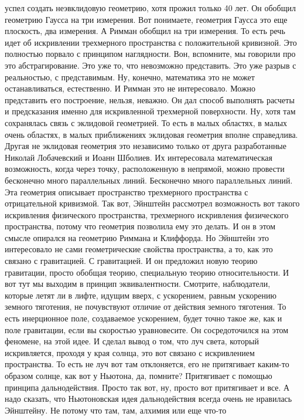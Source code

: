 успел создать неэвклидовую геометрию, хотя прожил только 40 лет. Он обобщил
геометрию Гаусса на три измерения. Вот понимаете, геометрия Гаусса это еще
плоскость, два измерения. А Римман обобщил на три измерения. То есть речь идет
об искривлении трехмерного пространства с положительной кривизной. Это полностью
порвало с принципом наглядности. Вон, вспомните, мы говорили про это
абстрагирование. Это уже то, что невозможно представить. Это уже разрыв с
реальностью, с представимым. Ну, конечно, математика это не может
останавливаться, естественно. И Римман это не интересовало. Можно представить
его построение, нельзя, неважно. Он дал способ выполнять расчеты и предсказания
именно для искривленной трехмерной поверхности. Ну, хотя там сохранялась связь с
эклидовой геометрией. То есть в малых областях, в малых очень областях, в малых
приближениях эклидовая геометрия вполне справедлива. Другая не эклидовая
геометрия это независимо только от друга разработанные Николай Лобачевский и
Иоанн Шболиев. Их интересовала математическая возможность, когда через точку,
расположенную в непрямой, можно провести бесконечно много параллельных линий.
Бесконечно много параллельных линий. Эта геометрия описывает пространство
трехмерного пространства с отрицательной кривизмой. Так вот, Эйнштейн рассмотрел
возможность вот такого искривления физического пространства, трехмерного
искривления физического пространства, потому что геометрия позволила ему это
делать. И он в этом смысле опирался на геометрию Риммана и Клиффорда. Но
Эйнштейн это интересовало не сами геометрические свойства пространства, а то,
как это связано с гравитацией. С гравитацией. И он предложил новую теорию
гравитации, просто обобщая теорию, специальную теорию относительности. И вот тут
мы выходим в принцип эквивалентности. Смотрите, наблюдатели, которые летят ли в
лифте, идущим вверх, с ускорением, равным ускорению земного тяготения, не
почувствуют отличие от действия земного тяготения. То есть инерционное поле,
создаваемое ускорением, будет точно такое же, как и поле гравитации, если вы
скоростью уравновесите. Он сосредоточился на этом феномене, на этой идее. И
сделал вывод о том, что луч света, который искривляется, проходя у края солнца,
это вот связано с искривлением пространства. То есть не луч вот там отклоняется,
его не притягивает каким-то образом солнце, как вот у Ньютона, да, помните?
Притягивает с помощью принципа дальнодействия. Просто так вот, ну, просто вот
притягивает и все. А надо сказать, что Ньютоновская идея дальнодействия всегда
очень не нравилась Эйнштейну. Не потому что там, там, алхимия или еще что-то

